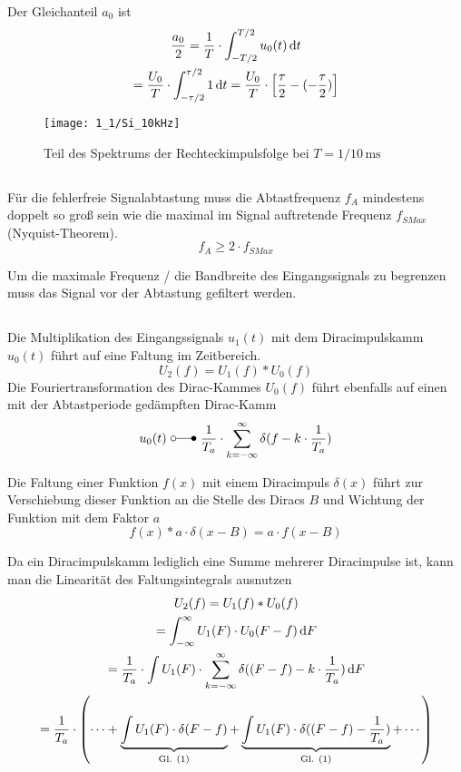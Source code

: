 \documentclass[a4paper, 12pt]{article}
\begin{document}
Der Gleichanteil $a_0$ ist
\begin{gather*}
  \frac{a_0}{2} = \frac{1}{T} \cdot \int_{-T/2}^{T/2}{u_0(t) \mathop{}\!\mathrm{d} t}\\
  = \frac{U_0}{T} \cdot \int_{-\tau/2}^{\tau/2}{ 1 \mathop{}\!\mathrm{d} t} = \frac{U_0}{T} \cdot
  \left[ \frac{\tau}{2} - (- \frac{\tau}{2}) \right] 
\end{gather*}

\begin{figure}[H]
	\texttt{[image: 1\_1/Si\_10kHz]}
  \caption{Teil des Spektrums der Rechteckimpulsfolge bei $T=1/10\,\si{\milli\second}$}
\end{figure}

\subsection{}
Für die fehlerfreie Signalabtastung muss die Abtastfrequenz $f_A$ mindestens
doppelt so groß sein wie die maximal im Signal auftretende Frequenz $f_{SMax}$ (Nyquist-Theorem).
\[
  f_A \geq 2\cdot f_{SMax}
\]

Um die maximale Frequenz / die Bandbreite des Eingangssignals zu begrenzen muss
das Signal vor der Abtastung gefiltert werden.


\subsection{}

Die Multiplikation des Eingangssignals $u_1(t)$ mit dem Diracimpulskamm $u_0(t)$
führt auf eine Faltung im Zeitbereich.
\[
U_2(f) = U_1(f) * U_0(f)
\]
Die Fouriertransformation des Dirac-Kammes $U_0(f)$
führt ebenfalls auf einen mit der Abtastperiode gedämpften Dirac-Kamm
\[
  u_0(t) \,\, \laplace \,\, \frac{1}{T_a} \cdot \sum_{k=-\infty}^{\infty}{\delta{(f - k
      \cdot \frac{1}{T_a})}}
\]

Die Faltung einer Funktion $f(x)$ mit einem Diracimpuls $\delta(x)$ führt zur Verschiebung dieser
Funktion an die Stelle des Diracs $B$ und Wichtung der Funktion mit dem Faktor $a$
\begin{equation}
\label{eq:1}
  f(x) * a \cdot \delta(x - B) = a \cdot f(x - B)
\end{equation}

Da ein Diracimpulskamm lediglich eine Summe mehrerer Diracimpulse ist, kann man
die Linearität des Faltungsintegrals ausnutzen
\begin{gather*}
  U_2(f) = U_1(f) * U_0(f)\\
  = \int_{-\infty}^{\infty}{U_1(F) \cdot U_0(F - f) \mathop{}\!\mathrm{d} F}\\  
  = \frac{1}{T_a} \cdot \int{U_1(F) \cdot \sum_{k=-\infty}^{\infty}{\delta((F-f) - k
      \cdot \frac{1}{T_a})} \mathop{}\!\mathrm{d}F }\\
  = \frac{1}{T_a} \cdot \left( \cdots + \underbrace{
      \int{U_1(F) \cdot \delta{(F-f)}}
    }_{\textrm{Gl. } (1)}
    +
    \underbrace{
      \int{U_1(F) \cdot \delta{((F-f) - \frac{1}{T_a})}}
      }_{\textrm{Gl. } (1)}
      + \cdots \right)
\end{gather*}
\end{document}
